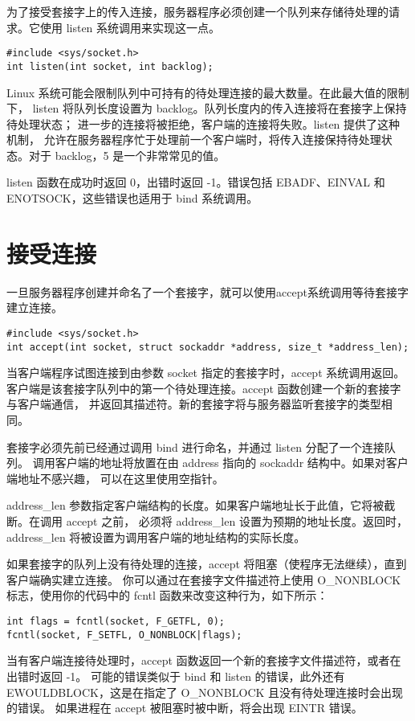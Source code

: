 \documentclass{ctexart}
\begin{document}
为了接受套接字上的传入连接，服务器程序必须创建一个队列来存储待处理的请求。它使用 listen 系统调用来实现这一点。  
\begin{verbatim}  
#include <sys/socket.h>  
int listen(int socket, int backlog);  
\end{verbatim}  
Linux 系统可能会限制队列中可持有的待处理连接的最大数量。在此最大值的限制下，
listen 将队列长度设置为 backlog。队列长度内的传入连接将在套接字上保持待处理状态；
进一步的连接将被拒绝，客户端的连接将失败。listen 提供了这种机制，
允许在服务器程序忙于处理前一个客户端时，将传入连接保持待处理状态。对于 backlog，5 是一个非常常见的值。  
  
listen 函数在成功时返回 0，出错时返回 -1。错误包括 EBADF、EINVAL 和 ENOTSOCK，这些错误也适用于 bind 系统调用。  

\section{接受连接}  
一旦服务器程序创建并命名了一个套接字，就可以使用accept系统调用等待套接字建立连接。  
\begin{verbatim}  
#include <sys/socket.h>  
int accept(int socket, struct sockaddr *address, size_t *address_len);  
\end{verbatim}  

当客户端程序试图连接到由参数 socket 指定的套接字时，accept 系统调用返回。
客户端是该套接字队列中的第一个待处理连接。accept 函数创建一个新的套接字与客户端通信，
并返回其描述符。新的套接字将与服务器监听套接字的类型相同。  
  
套接字必须先前已经通过调用 bind 进行命名，并通过 listen 分配了一个连接队列。
调用客户端的地址将放置在由 address 指向的 sockaddr 结构中。如果对客户端地址不感兴趣，
可以在这里使用空指针。  
  
address\_len 参数指定客户端结构的长度。如果客户端地址长于此值，它将被截断。在调用 accept 之前，
必须将 address\_len 设置为预期的地址长度。返回时，address\_len 将被设置为调用客户端的地址结构的实际长度。  
  
如果套接字的队列上没有待处理的连接，accept 将阻塞（使程序无法继续），直到客户端确实建立连接。
你可以通过在套接字文件描述符上使用 O\_NONBLOCK 标志，使用你的代码中的 fcntl 函数来改变这种行为，如下所示：  
\begin{verbatim}  
int flags = fcntl(socket, F_GETFL, 0);  
fcntl(socket, F_SETFL, O_NONBLOCK|flags);  
\end{verbatim}  
当有客户端连接待处理时，accept 函数返回一个新的套接字文件描述符，或者在出错时返回 -1。
可能的错误类似于 bind 和 listen 的错误，此外还有 EWOULDBLOCK，这是在指定了 O\_NONBLOCK 且没有待处理连接时会出现的错误。
如果进程在 accept 被阻塞时被中断，将会出现 EINTR 错误。
\end{document}
